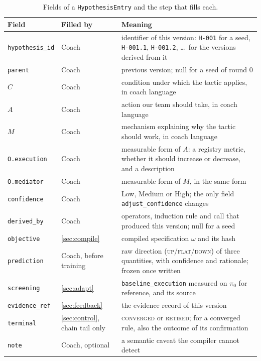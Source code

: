 \documentclass[11pt]{article}
\newcommand{\code}[1]{\texttt{\small #1}}
\newcommand{\pUp}{\textsc{up}}
\newcommand{\pFlat}{\textsc{flat}}
\newcommand{\pDown}{\textsc{down}}
\begin{document}
\begin{table}[t]
\centering\small
\caption{Fields of a \code{HypothesisEntry} and the step that fills each.}
\label{tab:fields}
\begin{tabularx}{\linewidth}{@{}l l X@{}}
\toprule
Field & Filled by & Meaning \\
\midrule
\code{hypothesis\_id} & Coach & identifier of this version: \code{H-001} for a seed, \code{H-001.1}, \code{H-001.2}, \dots\ for the versions derived from it \\
\code{parent} & Coach & previous version; null for a seed of round 0 \\
$C$ & Coach & condition under which the tactic applies, in coach language \\
$A$ & Coach & action our team should take, in coach language \\
$M$ & Coach & mechanism explaining why the tactic should work, in coach language \\
\code{O.execution} & Coach & measurable form of $A$: a registry metric, whether it should increase or decrease, and a description \\
\code{O.mediator} & Coach & measurable form of $M$, in the same form \\
\code{confidence} & Coach & Low, Medium or High; the only field \code{adjust\_confidence} changes \\
\code{derived\_by} & Coach & operators, induction rule and call that produced this version; null for a seed \\
\code{objective} & \cref{sec:compile} & compiled specification $\omega$ and its hash \\
\code{prediction} & Coach, before training & raw direction (\pUp/\pFlat/\pDown) of three quantities, with confidence and rationale; frozen once written \\
\code{screening} & \cref{sec:adapt} & \code{baseline\_execution} measured on $\pi_0$ for reference, and its source \\
\code{evidence\_ref} & \cref{sec:feedback} & the evidence record of this version \\
\code{terminal} & \cref{sec:control}, chain tail only & \textsc{converged} or \textsc{retired}; for a converged rule, also the outcome of its confirmation \\
\code{note} & Coach, optional & a semantic caveat the compiler cannot detect \\
\bottomrule
\end{tabularx}
\end{table}
\end{document}
